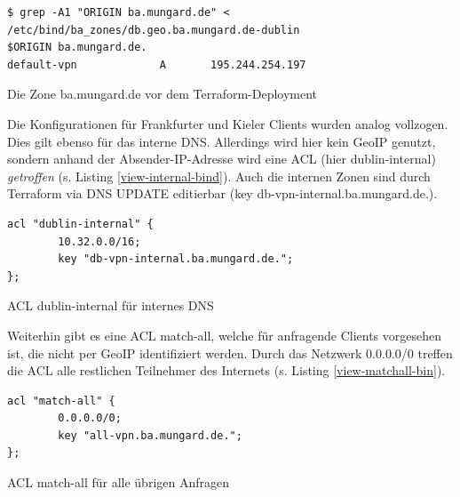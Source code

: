 \begin{listing}[h]
\begin{verbatim}
$ grep -A1 "ORIGIN ba.mungard.de" < /etc/bind/ba_zones/db.geo.ba.mungard.de-dublin
$ORIGIN ba.mungard.de.
default-vpn             A       195.244.254.197
\end{verbatim}
\caption{Die Zone ba.mungard.de vor dem Terraform-Deployment}
\label{zone-dublin-before-deployment}
\end{listing}\FloatBarrier
Die Konfigurationen für Frankfurter und Kieler \gls{Client}s wurden analog vollzogen. Dies gilt ebenso für das interne \gls{DNS}. Allerdings wird hier kein \gls{GeoIP} genutzt, sondern anhand der Absender-IP-Adresse wird eine \gls{ACL} (hier \glqq dublin-internal\grqq{}) \textit{getroffen} (s. Listing \ref{view-internal-bind}). Auch die internen Zonen sind durch Terraform via \gls{DNS} UPDATE editierbar (key \glqq db-vpn-internal.ba.mungard.de.\grqq{}).
\begin{listing}[h]
\begin{verbatim}
acl "dublin-internal" {
        10.32.0.0/16;
        key "db-vpn-internal.ba.mungard.de.";
};
\end{verbatim}
\caption{ACL \glqq dublin-internal\grqq{} für internes DNS}
\label{view-internal-bind}
\end{listing}\FloatBarrier
Weiterhin gibt es eine \gls{ACL} \glqq match-all\grqq{}, welche für anfragende \gls{Client}s vorgesehen ist, die nicht per \gls{GeoIP} identifiziert werden. Durch das Netzwerk 0.0.0.0/0 treffen die \gls{ACL} alle restlichen Teilnehmer des Internets (s. Listing \ref{view-matchall-bin}).
\begin{listing}[h]
\begin{verbatim}
acl "match-all" {
        0.0.0.0/0;
        key "all-vpn.ba.mungard.de.";
};
\end{verbatim}
\caption{ACL \glqq match-all\grqq{} für alle übrigen Anfragen}
\label{view-matchall-bin}
\end{listing}\FloatBarrier


